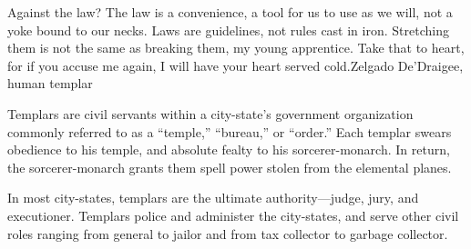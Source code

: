 {Against the law? The law is a convenience, a tool for us to use as we will, not a yoke bound to our necks. Laws are guidelines, not rules cast in iron. Stretching them is not the same as breaking them, my young apprentice. Take that to heart, for if you accuse me again, I will have your heart served cold.}{Zelgado De'Draigee, human templar}

Templars are civil servants within a city-state's government organization commonly referred to as a ``temple,'' ``bureau,'' or ``order.'' Each templar swears obedience to his temple, and absolute fealty to his sorcerer-monarch. In return, the sorcerer-monarch grants them spell power stolen from the elemental planes.

In most city-states, templars are the ultimate authority---judge, jury, and executioner. Templars police and administer the city-states, and serve other civil roles ranging from general to jailor and from tax collector to garbage collector.

